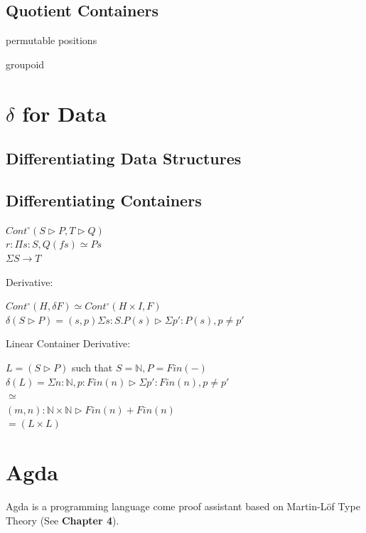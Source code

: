 \documentclass[12pt]{report}
\begin{document}
\section{Quotient Containers}

permutable positions

groupoid

\chapter{$\delta$ for Data}

\section{Differentiating Data Structures}

\section{Differentiating Containers}
\begin{center}
$Cont^{\circ}(S \rhd P, T \rhd Q)$\\
$r: \Pi s : S, Q(f s) \simeq  P s$\\
$\Sigma S \rightarrow T$
\end{center}
Derivative:
\begin{center}
$Cont^{\circ}(H, \delta F) \simeq  Cont^{\circ}(H \times I, F)$\\
$\delta (S \rhd P) = (s,p) \Sigma s : S . P(s) \rhd \Sigma p':P(s),p \neq p'$
\end{center}


Linear Container Derivative:
\begin{center}
$L = (S \rhd P)$ such that $S = \mathbb{N}, P = Fin(-)$\\
$\delta(L) = \Sigma n : \mathbb{N}, p: Fin(n) \rhd \Sigma p' : Fin(n), p \neq p'$\\
$\simeq $\\
$(m,n): \mathbb{N} \times \mathbb{N} \rhd Fin(n) + Fin(n)$\\
$= (L \times L)$\\
\end{center} 


\chapter{Agda}
Agda is a programming language come proof assistant based on Martin-L\"of Type Theory (See \textbf{Chapter 4}).
\end{document}
